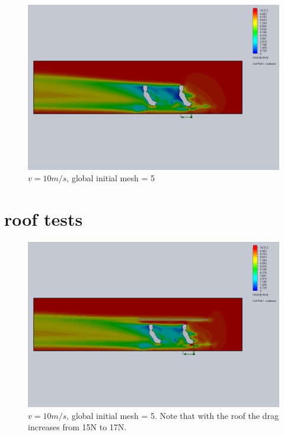 \documentclass[11pt]{article}
\begin{document}
\begin{figure}
\includegraphics[width=\textwidth]{gm_5_rf_7_v10.png}
\caption{$v = 10 m/s$, global initial mesh = 5}
\end{figure}

\clearpage

\section{roof tests}

\begin{figure}[ht]
\includegraphics[width=\textwidth]{gm_5_rf_7_v10_roof0.png}
\caption{$v = 10 m/s$, global initial mesh = 5. Note that with the roof the drag increases from 15N to 17N. }
\end{figure}
\end{document}
